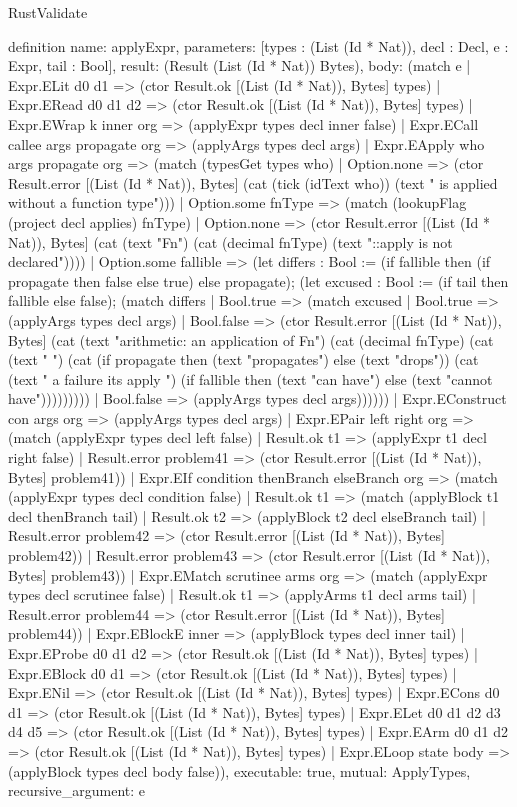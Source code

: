 \begin{lexlean}{RustValidate}
\begin{semanticmodule}
definition{
  name: applyExpr,
  parameters: [types : (List (Id * Nat)), decl : Decl, e : Expr, tail : Bool],
  result: (Result (List (Id * Nat)) Bytes),
  body: (match e
    | Expr.ELit d0 d1 => (ctor Result.ok [(List (Id * Nat)), Bytes] types)
    | Expr.ERead d0 d1 d2 => (ctor Result.ok [(List (Id * Nat)), Bytes] types)
    | Expr.EWrap k inner org => (applyExpr types decl inner false)
    | Expr.ECall callee args propagate org => (applyArgs types decl args)
    | Expr.EApply who args propagate org => (match (typesGet types who)
      | Option.none => (ctor Result.error [(List (Id * Nat)), Bytes] (cat (tick (idText who)) (text " is applied without a function type")))
      | Option.some fnType => (match (lookupFlag (project decl applies) fnType)
        | Option.none => (ctor Result.error [(List (Id * Nat)), Bytes] (cat (text "Fn") (cat (decimal fnType) (text "::apply is not declared"))))
        | Option.some fallible => (let differs : Bool := (if fallible then (if propagate then false else true) else propagate); (let excused : Bool := (if tail then fallible else false); (match differs
          | Bool.true => (match excused
            | Bool.true => (applyArgs types decl args)
            | Bool.false => (ctor Result.error [(List (Id * Nat)), Bytes] (cat (text "arithmetic: an application of Fn") (cat (decimal fnType) (cat (text " ") (cat (if propagate then (text "propagates") else (text "drops")) (cat (text " a failure its apply ") (if fallible then (text "can have") else (text "cannot have")))))))))
          | Bool.false => (applyArgs types decl args))))))
    | Expr.EConstruct con args org => (applyArgs types decl args)
    | Expr.EPair left right org => (match (applyExpr types decl left false)
      | Result.ok t1 => (applyExpr t1 decl right false)
      | Result.error problem41 => (ctor Result.error [(List (Id * Nat)), Bytes] problem41))
    | Expr.EIf condition thenBranch elseBranch org => (match (applyExpr types decl condition false)
      | Result.ok t1 => (match (applyBlock t1 decl thenBranch tail)
        | Result.ok t2 => (applyBlock t2 decl elseBranch tail)
        | Result.error problem42 => (ctor Result.error [(List (Id * Nat)), Bytes] problem42))
      | Result.error problem43 => (ctor Result.error [(List (Id * Nat)), Bytes] problem43))
    | Expr.EMatch scrutinee arms org => (match (applyExpr types decl scrutinee false)
      | Result.ok t1 => (applyArms t1 decl arms tail)
      | Result.error problem44 => (ctor Result.error [(List (Id * Nat)), Bytes] problem44))
    | Expr.EBlockE inner => (applyBlock types decl inner tail)
    | Expr.EProbe d0 d1 d2 => (ctor Result.ok [(List (Id * Nat)), Bytes] types)
    | Expr.EBlock d0 d1 => (ctor Result.ok [(List (Id * Nat)), Bytes] types)
    | Expr.ENil => (ctor Result.ok [(List (Id * Nat)), Bytes] types)
    | Expr.ECons d0 d1 => (ctor Result.ok [(List (Id * Nat)), Bytes] types)
    | Expr.ELet d0 d1 d2 d3 d4 d5 => (ctor Result.ok [(List (Id * Nat)), Bytes] types)
    | Expr.EArm d0 d1 d2 => (ctor Result.ok [(List (Id * Nat)), Bytes] types)
    | Expr.ELoop state body => (applyBlock types decl body false)),
  executable: true,
  mutual: ApplyTypes,
  recursive_argument: e
}


\end{semanticmodule}
\end{lexlean}
